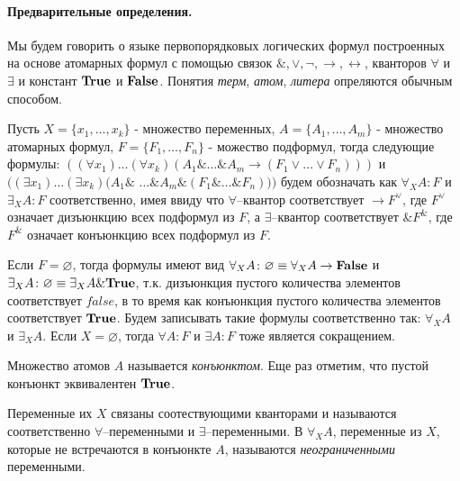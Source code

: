 \documentclass[a4paper]{jctart15b}
\begin{document}
\paragraph{Предварительные определения.}

Мы будем говорить о языке первопорядковых логических формул построенных на основе атомарных формул с помощью связок  $\&, \vee, \neg, \rightarrow, \leftrightarrow$, кванторов $\forall$ и $\exists$ и констант $\text{\textbf{True}}$ и $\text{\textbf{False}}$. Понятия \emph{терм}, \emph{атом}, \emph{литера} опреляются обычным способом.

Пусть $X = \{x_1,\ldots,x_k\}$ - множество переменных, $A = \{A_1,\ldots,A_m\}$ - множество атомарных формул, $F = \{F_1,\ldots,F_n\}$ - можество подформул, тогда следующие формулы: $((\forall x_1) \ldots (\forall x_k) (A_1 \& \ldots \& A_m \rightarrow (F_1 \vee \ldots \vee F_n)))$ и $((\exists x_1) \ldots (\exists x_k) (A_1 \&$ $\ldots \& A_m \& (F_1 \& \ldots \& F_n)))$ будем обозначать как $\forall_XA\colon F$ и $\exists_XA\colon F$ соответственно, имея ввиду что $\forall$--квантор соответствует $\rightarrow F^{\vee}$, где $F^{\vee}$ означает дизъюнкцию всех подформул из $F$, а $\exists$--квантор соответствует $\& F^{\&}$, где $F^{\&}$ означает конъюнкцию всех подформул из $F$.

Если $F = \varnothing$, тогда формулы имеют вид $\forall_XA\colon\varnothing \equiv \forall_XA \rightarrow \text{\textbf{False}}$ и $\exists_XA\colon\varnothing \equiv \exists_XA \& \text{\textbf{True}}$, т.к. дизъюнкция пустого количества элементов соответствует $false$, в то время как конъюнкция пустого количества элементов соответствует $\text{\textbf{True}}$. Будем записывать такие формулы соответственно так: $\forall_XA$ и $\exists_XA$. Если $X = \varnothing$, тогда $\forall A\colon F$ и $\exists A\colon F$ тоже является сокращением.

Множество атомов $A$ называется {\em конъюнктом}. Еще раз отметим, что пустой конъюнкт эквивалентен $\text{\textbf{True}}$.

Переменные их $X$ связаны соотествующими кванторами и называются соответственно $\forall$--переменными и $\exists$--переменными. В $\forall_XA$, переменные из $X$, которые не встречаются в конъюнкте $A$, называются {\em неограниченными} переменными.

\end{document}
